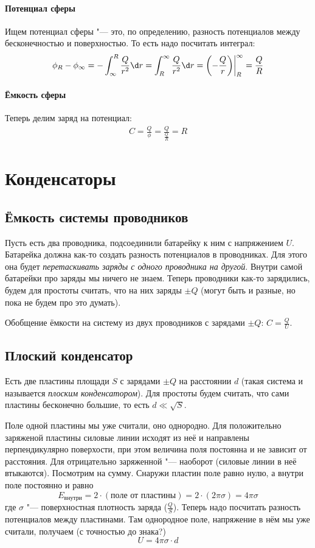 		\subsubsection{Потенциал сферы}
			Ищем потенциал сферы "--- это, по определению, разность потенциалов между	бесконечностью и поверхностью.
			То есть надо посчитать интеграл:
			\begin{gather*}
			\phi_{R} - \phi_{\infty}
				= -\int_{\infty}^{R} \frac{Q}{r^2} \d r
				= \int_{R}^{\infty} \frac{Q}{r^2} \d r
				= \left(-\frac{Q}{r}\right)\biggr|_R^\infty
				= \frac{Q}{R}
			\end{gather*}
		\subsubsection{Ёмкость сферы}
			Теперь делим заряд на потенциал:
			\begin{gather*}
			C = \frac{Q}{\phi} = \frac{Q}{\frac QR} = R
			\end{gather*}

\chapter{Конденсаторы}
\section{Ёмкость системы проводников}
	Пусть есть два проводника, подсоединили батарейку к ним с напряжением $U$.
	Батарейка должна как-то создать разность потенциалов в проводниках.
	Для этого она будет \textit{перетаскивать заряды с одного проводника на другой}.
	Внутри самой батарейки про заряды мы ничего не знаем.
	Теперь проводники как-то зарядились, будем для простоты считать, что на них заряды $\pm Q$
	(могут быть и разные, но пока не будем про это думать).
	\begin{Def}
		Обобщение ёмкости на систему из двух проводников с зарядами $\pm Q$:
		$C=\frac QU$.
	\end{Def}

\section{Плоский конденсатор}
	Есть две пластины площади $S$ с зарядами $\pm Q$ на расстоянии $d$
	(такая система и называется \textit{плоским конденсатором}).
	Для простоты будем считать, что сами пластины бесконечно большие, то есть $d \ll \sqrt S$.

	Поле одной пластины мы уже считали, оно однородно.
	Для положительно заряженой пластины силовые линии исходят из неё и направлены перпендикулярно поверхости,
	при этом величина поля постоянна и не зависит от расстояния.
	Для отрицательно заряженной "--- наоборот (силовые линии в неё втыкаются).
	Посмотрим на сумму.
	Снаружи пластин поле равно нулю, а внутри поле постоянно и равно
	\[E_{\text{внутри}} = 2\cdot(\text{поле от пластины}) = 2\cdot(2\pi \sigma) = 4\pi\sigma\]
	где $\sigma$ "--- поверхностная плотность заряда ($\frac Q S$).
	Теперь надо посчитать разность потенциалов между пластинами.
	Там однородное поле, напряжение в нём мы уже считали, получаем (с точностью до знака?)
	\[U = 4\pi\sigma \cdot d\]

